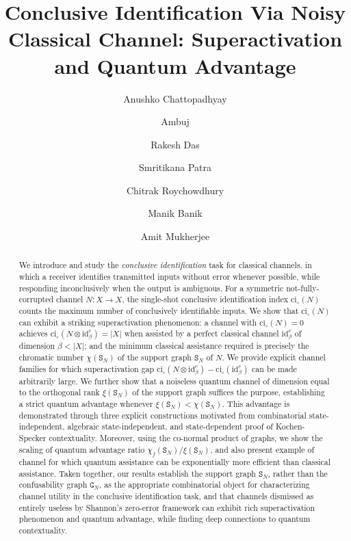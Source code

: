 \documentclass[12pt,a4paper]{article}
\title{\textbf{Conclusive Identification Via Noisy Classical Channel: Superactivation and Quantum Advantage}}
\author[1]{Anushko Chattopadhyay}
\author[1]{Ambuj}
\author[1]{Rakesh Das}
\author[1]{Smritikana Patra}
\author[1]{Chitrak Roychowdhury}
\author[2]{Manik Banik}
\author[1]{Amit Mukherjee}
\affil[1]{Indian Institute of Technology Jodhpur, Jodhpur 342030, India}
\affil[2]{S.\,N.\,Bose National Centre for Basic Sciences, Block JD, Sector III, Salt Lake, Kolkata 700106, India}
\date{}
\begin{document}
\maketitle

\begin{abstract}
We introduce and study the \emph{conclusive identification} task for classical channels, in which a receiver identifies transmitted inputs without error whenever possible, while responding inconclusively when the output is ambiguous. For a symmetric not-fully-corrupted channel $N : X \to X$, the single-shot conclusive identification index $\mathrm{ci}_\circ(N)$ counts the maximum number of conclusively identifiable inputs. We show that $\mathrm{ci}_\circ(N)$ can exhibit a striking superactivation phenomenon: a channel with $\mathrm{ci}_\circ(N) = 0$ achieves $\mathrm{ci}_\circ(N \otimes \mathrm{id}^c_\beta) = |X|$ when assisted by a perfect classical channel $\mathrm{id}^c_\beta$ of dimension $\beta < |X|$; and the minimum classical assistance required is precisely the chromatic number $\chi(\mathtt{S}_N)$ of the support graph $\mathtt{S}_N$ of $N$. We provide explicit channel families for which superactivation gap $\mathrm{ci}_\circ(N \otimes \mathrm{id}^c_\beta) - \mathrm{ci}_\circ(\mathrm{id}^c_\beta)$ can be made arbitrarily large. We further show that a noiseless quantum channel of dimension equal to the orthogonal rank $\xi(\mathtt{S}_N)$ of the support graph suffices the purpose, establishing a strict quantum advantage whenever $\xi(\mathtt{S}_N) < \chi(\mathtt{S}_N)$. This advantage is demonstrated through three explicit constructions motivated from combinatorial state-independent, algebraic state-independent, and state-dependent proof of Kochen-Specker contextuality. Moreover, using the co-normal product of graphs, we show the scaling of quantum advantage ratio $\chi_f(\mathtt{S}_N)/\xi(\mathtt{S}_N)$, and also present example of channel for which quantum assistance can be exponentially more efficient than classical assistance. Taken together, our results establish the support graph $\mathtt{S}_N$, rather than the confusability graph $\mathtt{G}_N$, as the appropriate combinatorial object for characterizing channel utility in the conclusive identification task, and that channels dismissed as entirely useless by Shannon's zero-error framework can exhibit rich superactivation phenomenon and quantum advantage, while finding deep connections to quantum contextuality.
\end{abstract}
\end{document}
